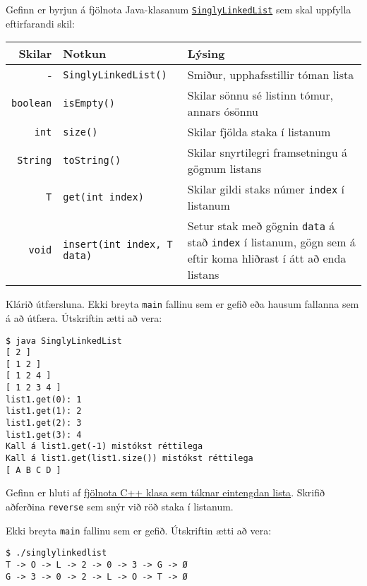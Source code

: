 \documentclass{article}
\begin{document}
\question

Gefinn er byrjun á fjölnota Java-klasanum \href{https://raw.githubusercontent.com/Ernir/kennsluefni/master/T2/Code/w4/SinglyLinkedList.java}{\texttt{SinglyLinkedList}} sem skal uppfylla eftirfarandi skil:

\begin{center}
\begin{tabularx}{\linewidth}{rlX}
\toprule
Skilar&Notkun&Lýsing\\
\midrule
-&\texttt{SinglyLinkedList()}& Smiður, upphafsstillir tóman lista\\
\texttt{boolean}&\texttt{isEmpty()}&Skilar sönnu sé listinn tómur, annars ósönnu\\
\texttt{int}&\texttt{size()}&Skilar fjölda staka í listanum\\
\texttt{String}&\texttt{toString()}&Skilar snyrtilegri framsetningu á gögnum listans\\
\texttt{T}&\texttt{get(int index)}&Skilar gildi staks númer \texttt{index} í listanum\\
\texttt{void}&\texttt{insert(int index, T data)}&Setur stak með gögnin \texttt{data} á stað \texttt{index} í listanum, gögn sem á eftir koma hliðrast í átt að enda listans\\
\bottomrule
\end{tabularx}
\end{center}
Klárið útfærsluna. Ekki breyta \texttt{main} fallinu sem er gefið eða hausum fallanna sem á að útfæra. Útskriftin ætti að vera:

\begin{verbatim}
$ java SinglyLinkedList
[ 2 ]
[ 1 2 ]
[ 1 2 4 ]
[ 1 2 3 4 ]
list1.get(0): 1
list1.get(1): 2
list1.get(2): 3
list1.get(3): 4
Kall á list1.get(-1) mistókst réttilega
Kall á list1.get(list1.size()) mistókst réttilega
[ A B C D ]
\end{verbatim}

\question

Gefinn er hluti af \href{https://raw.githubusercontent.com/Ernir/kennsluefni/master/T2/Code/w4/singlylinkedlist.cpp}{fjölnota C++ klasa sem táknar eintengdan lista}. Skrifið aðferðina \texttt{reverse} sem snýr við röð staka í listanum.

Ekki breyta \texttt{main} fallinu sem er gefið. Útskriftin ætti að vera:
\begin{verbatim}
$ ./singlylinkedlist
T -> O -> L -> 2 -> 0 -> 3 -> G -> Ø
G -> 3 -> 0 -> 2 -> L -> O -> T -> Ø
\end{verbatim}
\end{document}
